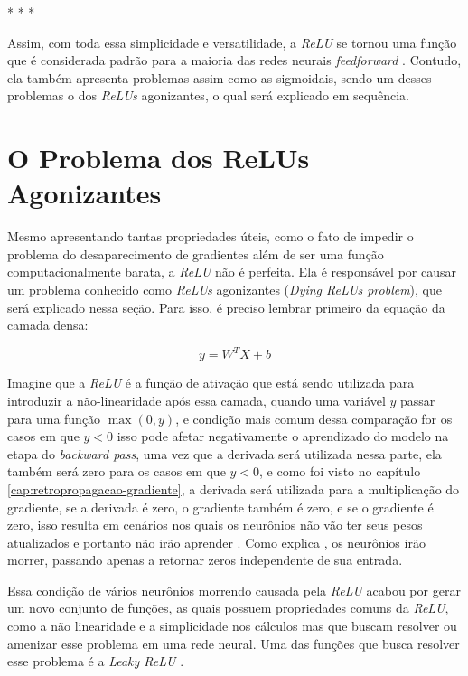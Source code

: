 \medskip
\begin{center}
 * * *
\end{center}
\medskip

Assim, com toda essa simplicidade e versatilidade, a \textit{ReLU} se tornou uma função que é considerada padrão para a maioria das redes neurais \textit{feedforward} \parencite{DeepLearningBook}. Contudo, ela também apresenta problemas assim como as sigmoidais, sendo um desses problemas o dos \textit{ReLUs} agonizantes, o qual será explicado em sequência.

\section{O Problema dos ReLUs Agonizantes} 

Mesmo apresentando tantas propriedades úteis, como o fato de impedir o problema do desaparecimento de gradientes além de ser uma função computacionalmente barata, a \textit{ReLU} não é perfeita. Ela é responsável por causar um problema conhecido como \textit{ReLUs} agonizantes (\textit{Dying ReLUs problem}), que será explicado nessa seção. Para isso, é preciso lembrar primeiro da equação da camada densa:

\[
    y = W^T  X + b
\]

Imagine que a \textit{ReLU} é a função de ativação que está sendo utilizada para introduzir a não-linearidade após essa camada, quando uma variável $y$ passar para uma função $\max(0, y)$, e condição mais comum dessa comparação for os casos em que $y < 0$ isso pode afetar negativamente o aprendizado do modelo na etapa do \textit{backward pass}, uma vez que a derivada será utilizada nessa parte, ela também será zero para os casos em que $y < 0$, e como foi visto no capítulo \ref{cap:retropropagacao-gradiente}, a derivada será utilizada para a multiplicação do gradiente, se a derivada é zero, o gradiente também é zero, e se o gradiente é zero, isso resulta em cenários nos quais os neurônios não vão ter seus pesos atualizados e portanto não irão aprender \parencite{DyingReluDouglas}. Como explica \textcite{DyingReluDouglas}, os neurônios irão morrer, passando apenas a retornar zeros independente de sua entrada.

Essa condição de vários neurônios morrendo causada pela \textit{ReLU} acabou por gerar um novo conjunto de funções, as quais possuem propriedades comuns da \textit{ReLU}, como a não linearidade e a simplicidade nos cálculos mas que buscam resolver ou amenizar esse problema em uma rede neural. Uma das funções que busca resolver esse problema é a \textit{Leaky ReLU} \parencite{DyingReluDouglas}.

